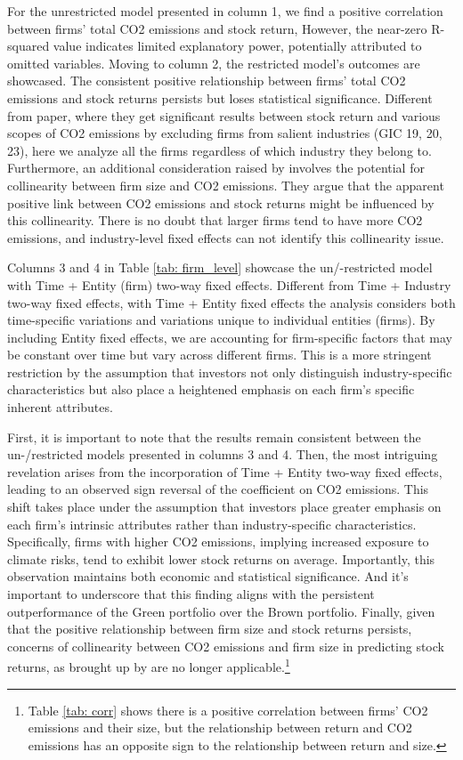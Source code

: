 \documentclass[12pt]{article}
\begin{document}
For the unrestricted model presented in column 1, we find a positive correlation between firms' total CO2 emissions and stock return, However, the near-zero R-squared value indicates limited explanatory power, potentially attributed to omitted variables. Moving to column 2, the restricted model's outcomes are showcased. The consistent positive relationship between firms' total CO2 emissions and stock returns persists but loses statistical significance. Different from \cite{bolton2021investors} paper, where they get significant results between stock return and various scopes of CO2 emissions by excluding firms from salient industries (GIC 19, 20, 23), here we analyze all the firms regardless of which industry they belong to. Furthermore, an additional consideration raised by \cite{aswani2023carbon} involves the potential for collinearity between firm size and CO2 emissions. They argue that the apparent positive link between CO2 emissions and stock returns might be influenced by this collinearity. There is no doubt that larger firms tend to have more CO2 emissions, and industry-level fixed effects can not identify this collinearity issue.

Columns 3 and 4 in Table \ref{tab: firm_level} showcase the un/-restricted model with Time + Entity (firm) two-way fixed effects. Different from Time + Industry two-way fixed effects, with Time + Entity fixed effects the analysis considers both time-specific variations and variations unique to individual entities (firms). By including Entity fixed effects, we are accounting for firm-specific factors that may be constant over time but vary across different firms. This is a more stringent restriction by the assumption that investors not only distinguish industry-specific characteristics but also place a heightened emphasis on each firm's specific inherent attributes. 

First, it is important to note that the results remain consistent between the un-/restricted models presented in columns 3 and 4. Then, the most intriguing revelation arises from the incorporation of Time + Entity two-way fixed effects, leading to an observed sign reversal of the coefficient on CO2 emissions. This shift takes place under the assumption that investors place greater emphasis on each firm's intrinsic attributes rather than industry-specific characteristics. Specifically, firms with higher CO2 emissions, implying increased exposure to climate risks, tend to exhibit lower stock returns on average. Importantly, this observation maintains both economic and statistical significance. And it's important to underscore that this finding aligns with the persistent outperformance of the Green portfolio over the Brown portfolio. Finally, given that the positive relationship between firm size and stock returns persists, concerns of collinearity between CO2 emissions and firm size in predicting stock returns, as brought up by \cite{aswani2023carbon} are no longer applicable.\footnote{Table \ref{tab: corr} shows there is a positive correlation between firms' CO2 emissions and their size, but the relationship between return and CO2 emissions has an opposite sign to the relationship between return and size.}
\end{document}
